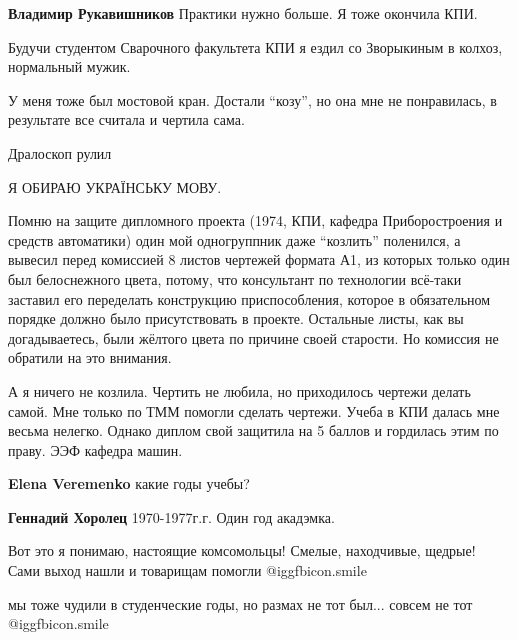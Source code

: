 \begin{itemize}
\begin{itemize}
\begin{itemize}
\end{itemize} %

\textbf{Владимир Рукавишников} Практики нужно больше. Я тоже окончила КПИ.

\end{itemize} %


Будучи студентом Сварочного факультета КПИ я ездил со Зворыкиным в колхоз,
нормальный мужик.


У меня тоже был мостовой кран. Достали \enquote{козу}, но она мне не
понравилась, в результате все считала и чертила сама.

Дралоскоп рулил

Я ОБИРАЮ УКРАЇНСЬКУ МОВУ.


Помню на защите дипломного проекта (1974, КПИ, кафедра Приборостроения и
средств автоматики) один мой одногруппник даже \enquote{козлить} поленился, а вывесил
перед комиссией 8 листов чертежей формата А1, из которых только один был
белоснежного цвета, потому, что консультант по технологии всё-таки заставил его
переделать конструкцию приспособления, которое в обязательном порядке должно
было присутствовать в проекте. Остальные листы, как вы догадываетесь, были
жёлтого цвета по причине своей старости. Но комиссия не обратили на это
внимания.



А я ничего не козлила. Чертить не любила, но приходилось чертежи делать самой.
Мне только по ТММ помогли сделать чертежи. Учеба в КПИ далась мне весьма
нелегко. Однако диплом свой защитила на 5 баллов и гордилась этим по праву. ЭЭФ
кафедра машин.

\begin{itemize} %
\textbf{Elena Veremenko} какие годы учебы?

\textbf{Геннадий Хоролец} 1970-1977г.г. Один год акадэмка.
\end{itemize} %


Вот это я понимаю, настоящие комсомольцы! Смелые, находчивые, щедрые! Сами
выход нашли и товарищам помогли  @igg{fbicon.smile} 

\begin{itemize} %
мы тоже чудили в студенческие годы, но размах не тот был... совсем не тот  @igg{fbicon.smile} 
\end{itemize} %


\end{itemize}
